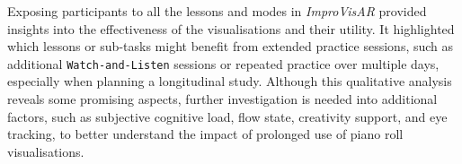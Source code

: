 \documentclass{vgtc}                          %
\begin{document}
\par %
Exposing participants to all the lessons and modes in \textit{ImproVisAR} provided insights into the effectiveness of the visualisations and their utility. It highlighted which lessons or sub-tasks might benefit from extended practice sessions, such as additional \texttt{Watch-and-Listen} sessions or repeated practice over multiple days, especially when planning a longitudinal study. Although this qualitative analysis reveals some promising aspects, further investigation is needed into additional factors, such as subjective cognitive load, flow state, creativity support, and eye tracking, to better understand the impact of prolonged use of piano roll visualisations.




% 




\end{document}
